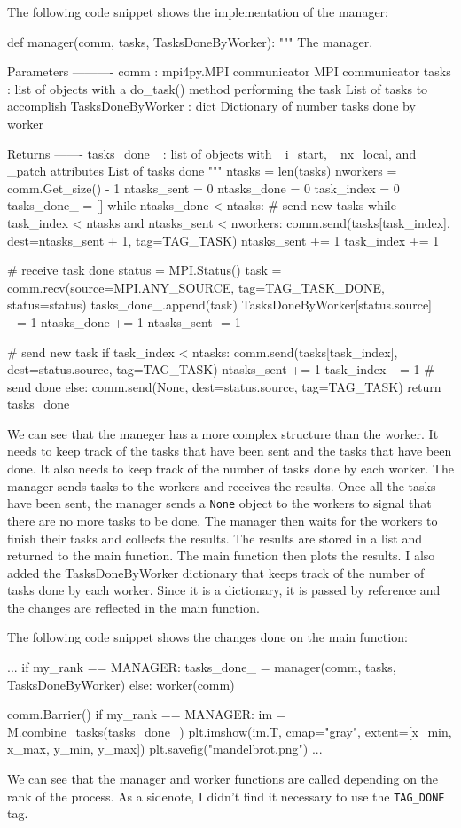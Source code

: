 \documentclass[unicode,11pt,a4paper,oneside,numbers=endperiod,openany]{scrartcl}
\begin{document}
The following code snippet shows the implementation of the manager:
\begin{pythonverbatim}
def manager(comm, tasks, TasksDoneByWorker):
"""
The manager.

Parameters
----------
comm : mpi4py.MPI communicator
    MPI communicator
tasks : list of objects with a do_task() method performing the task
    List of tasks to accomplish
TasksDoneByWorker : dict
    Dictionary of number tasks done by worker

Returns
-------
tasks_done_ : list of objects with _i_start, _nx_local, and _patch
attributes
    List of tasks done
"""
ntasks = len(tasks)
nworkers = comm.Get_size() - 1
ntasks_sent = 0
ntasks_done = 0
task_index = 0
tasks_done_ = []
while ntasks_done < ntasks:
    # send new tasks
    while task_index < ntasks and ntasks_sent < nworkers:
        comm.send(tasks[task_index], dest=ntasks_sent + 1, tag=TAG_TASK)
        ntasks_sent += 1
        task_index += 1

    # receive task done
    status = MPI.Status()
    task = comm.recv(source=MPI.ANY_SOURCE,
                        tag=TAG_TASK_DONE, status=status)
    tasks_done_.append(task)
    TasksDoneByWorker[status.source] += 1
    ntasks_done += 1
    ntasks_sent -= 1

    # send new task
    if task_index < ntasks:
        comm.send(tasks[task_index], dest=status.source, tag=TAG_TASK)
        ntasks_sent += 1
        task_index += 1
    # send done
    else:
        comm.send(None, dest=status.source, tag=TAG_TASK)
return tasks_done_
\end{pythonverbatim}
We can see that the maneger has a more complex structure than the worker. It
needs to keep track of the tasks that have been sent and the tasks that have
been done. It also needs to keep track of the number of tasks done by each
worker. The manager sends tasks to the workers and receives the results. Once
all the tasks have been sent, the manager sends a \texttt{None} object to the
workers to signal that there are no more tasks to be done. The manager then
waits for the workers to finish their tasks and collects the results. The
results are stored in a list and returned to the main function. The main
function then plots the results. I also added the TasksDoneByWorker dictionary
that keeps track of the number of tasks done by each worker. Since it is a
dictionary, it is passed by reference and the changes are reflected in the main
function. 

The following code snippet shows the changes done on the main
function:
\begin{pythonverbatim}
...
if my_rank == MANAGER:
    tasks_done_ = manager(comm, tasks, TasksDoneByWorker)
else:
    worker(comm)

comm.Barrier()
if my_rank == MANAGER:
    im = M.combine_tasks(tasks_done_)
    plt.imshow(im.T, cmap="gray", extent=[x_min, x_max, y_min, y_max])
    plt.savefig("mandelbrot.png")
...
\end{pythonverbatim}
We can see that the manager and worker functions are called depending on the
rank of the process. As a sidenote, I didn't find it necessary to use the
\texttt{TAG\_DONE} tag.
\end{document}
